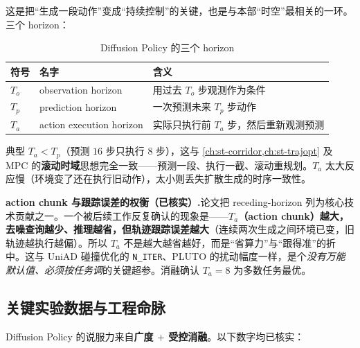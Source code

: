 这是把“生成一段动作”变成“持续控制”的关键，也是与本部“时空”最相关的一环。三个 horizon：

\begin{table}[H]\centering\small
\caption{Diffusion Policy 的三个 horizon}
\label{tab:de-horizons}
\begin{tabular}{p{} p{} p{}}
\toprule
符号 & 名字 & 含义 \\
\midrule
$T_o$ & observation horizon & 用过去 $T_o$ 步观测作为条件 \\
$T_p$ & prediction horizon & 一次预测未来 $T_p$ 步动作 \\
$T_a$ & action execution horizon & 实际只执行前 $T_a$ 步，然后重新观测预测 \\
\bottomrule
\end{tabular}
\end{table}

典型 $T_a<T_p$（预测 $16$ 步只执行 $8$ 步），这与 \cref{ch:st-corridor,ch:st-trajopt} 及 MPC 的\textbf{滚动时域}思想完全一致——预测一段、执行一截、滚动重规划。$T_a$ 太大反应慢（环境变了还在执行旧动作），太小则丢失扩散生成的时序一致性。

\begin{note}
\textbf{action chunk 与跟踪误差的权衡（已核实）.}\;论文把 receding-horizon 列为核心技术贡献之一。一个被后续工作反复确认的现象是——\textbf{$T_a$（action chunk）越大，去噪查询越少、推理越省，但轨迹跟踪误差越大}（连续两次生成之间环境已变，旧轨迹越执行越偏）。所以 $T_a$ 不是越大越省越好，而是“省算力”与“跟得准”的折中。这与 UniAD 碰撞优化的 \texttt{N\_ITER}、PLUTO 的扰动幅度一样，是个\emph{没有万能默认值、必须按任务调}的关键超参。消融确认 $T_a=8$ 为多数任务最优。
\end{note}

\subsection{关键实验数据与工程命脉}
\label{sec:de-dp-exp}

Diffusion Policy 的说服力来自\textbf{广度 $+$ 受控消融}。以下数字均已核实：

